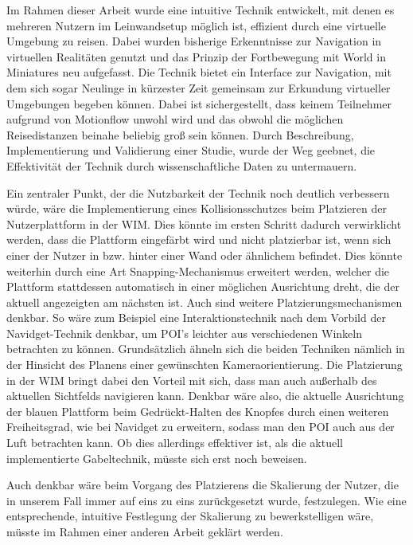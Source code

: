 Im Rahmen dieser Arbeit wurde eine intuitive Technik entwickelt, mit denen es mehreren Nutzern im Leinwandsetup möglich ist, effizient durch eine virtuelle Umgebung zu reisen. Dabei wurden bisherige Erkenntnisse zur Navigation in virtuellen Realitäten genutzt und das Prinzip der Fortbewegung mit World in Miniatures neu aufgefasst.
Die Technik bietet ein Interface zur Navigation, mit dem sich sogar Neulinge in kürzester Zeit gemeinsam zur Erkundung virtueller Umgebungen begeben können. Dabei ist sichergestellt, dass keinem Teilnehmer aufgrund von Motionflow unwohl wird und das obwohl die möglichen Reisedistanzen beinahe beliebig groß sein können.
Durch Beschreibung, Implementierung und Validierung einer Studie, wurde der Weg geebnet, die Effektivität der Technik durch wissenschaftliche Daten zu untermauern.

Ein zentraler Punkt, der die Nutzbarkeit der Technik noch deutlich verbessern würde, wäre die Implementierung eines Kollisionsschutzes beim Platzieren der Nutzerplattform in der WIM. Dies könnte im ersten Schritt dadurch verwirklicht werden, dass die Plattform eingefärbt wird und nicht platzierbar ist, wenn sich einer der Nutzer in bzw. hinter einer Wand oder ähnlichem befindet. Dies könnte weiterhin durch eine Art \glqq Snapping\grqq{}-Mechanismus erweitert werden, welcher die Plattform stattdessen automatisch in einer möglichen Ausrichtung dreht, die der aktuell angezeigten am nächsten ist.
Auch sind weitere Platzierungsmechanismen denkbar. So wäre zum Beispiel eine Interaktionstechnik nach dem Vorbild der Navidget-Technik \cite{HACHET2009225} denkbar, um POI's leichter aus verschiedenen Winkeln betrachten zu können. Grundsätzlich ähneln sich die beiden Techniken nämlich in der Hinsicht des Planens einer gewünschten Kameraorientierung. Die Platzierung in der WIM bringt dabei den Vorteil mit sich, dass man auch außerhalb des aktuellen Sichtfelds navigieren kann. Denkbar wäre also, die aktuelle Ausrichtung der blauen Plattform beim Gedrückt-Halten des Knopfes durch einen weiteren Freiheitsgrad, wie bei Navidget zu erweitern, sodass man den POI auch aus der Luft betrachten kann. Ob dies allerdings effektiver ist, als die aktuell implementierte Gabeltechnik, müsste sich erst noch beweisen.

Auch denkbar wäre beim Vorgang des Platzierens die Skalierung der Nutzer, die in unserem Fall immer auf eins zu eins zurückgesetzt wurde, festzulegen. Wie eine entsprechende, intuitive Festlegung der Skalierung zu bewerkstelligen wäre, müsste im Rahmen einer anderen Arbeit geklärt werden.

